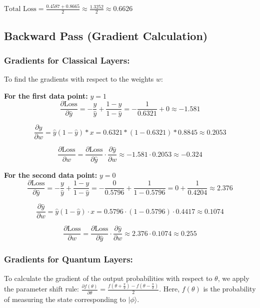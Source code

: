 \documentclass[a4paper]{article}
\begin{document}
\noindent $ \text{Total Loss} = \frac{0.4587 + 0.8665}{2} \approx \frac{1.3252}{2} \approx 0.6626 $

\subsection{Backward Pass (Gradient Calculation)}

\subsubsection{Gradients for Classical Layers:}
To find the gradients with respect to the weights \( w \):

\noindent \textbf{For the first data point:} ${y=1}$
\[ \frac{\partial \text{Loss}}{\partial \hat{y}} = -\frac{y}{\hat{y}} + \frac{1 - y}{1 - \hat{y}} = -\frac{1}{0.6321} + 0 \approx -1.581 \]

\[ \frac{\partial \hat{y}}{\partial w} = \hat{y}(1 - \hat{y}) * x = 0.6321 * (1 - 0.6321) * 0.8845 \approx  0.2053 \]

\[ \frac{\partial \text{Loss}}{\partial w} = \frac{\partial \text{Loss}}{\partial \hat{y}} \cdot \frac{\partial \hat{y}}{\partial w} \approx -1.581 \cdot 0.2053 \approx -0.324 \]

\noindent \textbf{For the second data point:} ${y=0}$
\[ \frac{\partial \text{Loss}}{\partial \hat{y}} = -\frac{y}{\hat{y}} + \frac{1 - y}{1 - \hat{y}} = -\frac{0}{0.5796} + \frac{1}{1 - 0.5796} = 0 + \frac{1}{0.4204}\approx 2.376 \]

\[ \frac{\partial \hat{y}}{\partial w} = \hat{y}(1 - \hat{y}) \cdot x = 0.5796 \cdot (1 - 0.5796) \cdot 0.4417 \approx 0.1074 \]

\[\frac{\partial \text{Loss}}{\partial w} = \frac{\partial \text{Loss}}{\partial \hat{y}} \cdot \frac{\partial \hat{y}}{\partial w} \approx 2.376 \cdot 0.1074 \approx 0.255\]

\subsubsection{Gradients for Quantum Layers:}
To calculate the gradient of the output probabilities with respect to \( \theta \), we apply the parameter shift rule: $ \frac{\partial f(\theta)}{\partial \theta} = \frac{f\left(\theta + \frac{\pi}{2}\right) - f\left(\theta - \frac{\pi}{2}\right)}{2}. $  Here, \( f(\theta) \) is the probability of measuring the state corresponding to \( |\phi\rangle \).\cite{mitarai2018quantum} \cite{schuld2019evaluating}\\
\end{document}

